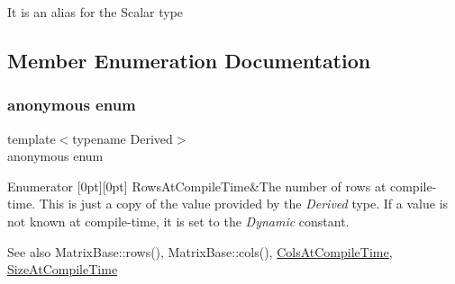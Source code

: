 It is an alias for the Scalar type 

\subsection{Member Enumeration Documentation}
\mbox{\label{class_eigen_1_1_sparse_matrix_base_a11b30ed44f64a137b4fa1ee638ca2d36}} 
\subsubsection{\texorpdfstring{anonymous enum}{anonymous enum}}
{\footnotesize\ttfamily template$<$typename Derived$>$ \\
anonymous enum}

\begin{DoxyEnumFields}{Enumerator}
[0pt][0pt]{}\mbox{\label{class_eigen_1_1_sparse_matrix_base_a11b30ed44f64a137b4fa1ee638ca2d36a456cda7b9d938e57194036a41d634604}} 
Rows\+At\+Compile\+Time&The number of rows at compile-\/time. This is just a copy of the value provided by the {\itshape Derived} type. If a value is not known at compile-\/time, it is set to the {\itshape Dynamic} constant. \begin{DoxySeeAlso}{See also}
Matrix\+Base\+::rows(), Matrix\+Base\+::cols(), \mbox{\hyperlink{class_eigen_1_1_sparse_matrix_base_a11b30ed44f64a137b4fa1ee638ca2d36a27ba349f075d026c1f51d1ec69aa5b14}{Cols\+At\+Compile\+Time}}, \mbox{\hyperlink{class_eigen_1_1_sparse_matrix_base_a11b30ed44f64a137b4fa1ee638ca2d36aa5022cfa2bb53129883e9b7b8abd3d68}{Size\+At\+Compile\+Time}} 
\end{DoxySeeAlso}
\\
\hline


\end{DoxyEnumFields}
